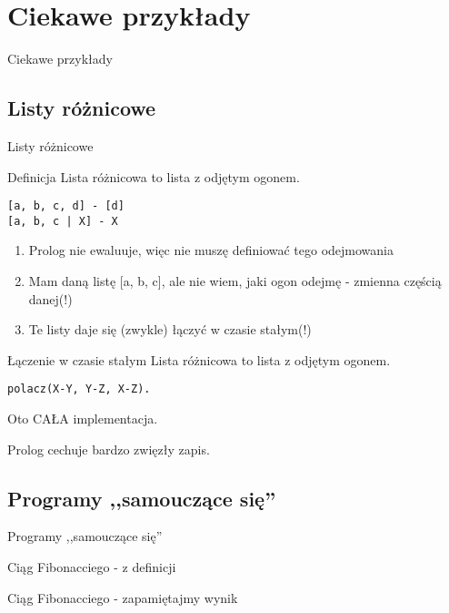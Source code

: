 \documentclass[blue]{beamer}
\newcommand{\tytul}[1]{\begin{frame}\begin{center}\begin{Huge}#1\end{Huge}\end{center}\end{frame}}
\begin{document}
\section{Ciekawe przykłady}
\tytul{Ciekawe przykłady}
\subsection{Listy różnicowe}
\tytul{Listy różnicowe}
\begin{frame}[fragile]{Definicja}
Lista różnicowa to lista z odjętym ogonem.
\begin{lstlisting}
[a, b, c, d] - [d]
[a, b, c | X] - X
\end{lstlisting}
\begin{enumerate}
\item Prolog nie ewaluuje, więc nie muszę definiować tego odejmowania
\item Mam daną listę [a, b, c], ale nie wiem, jaki ogon odejmę - zmienna częścią danej(!)
\item Te listy daje się (zwykle) łączyć w czasie stałym(!)
\end{enumerate}
\end{frame}
\begin{frame}[fragile]{Łączenie w czasie stałym}
Lista różnicowa to lista z odjętym ogonem.
\begin{lstlisting}
polacz(X-Y, Y-Z, X-Z).
\end{lstlisting}

Oto CAŁA implementacja.

Prolog cechuje bardzo zwięzły zapis.
\end{frame}
\subsection{Programy ,,samouczące się''}
\tytul{Programy ,,samouczące się''}
\begin{frame}{Ciąg Fibonacciego - z definicji}


\end{frame}
\begin{frame}{Ciąg Fibonacciego - zapamiętajmy wynik}

\end{frame}
\end{document}
